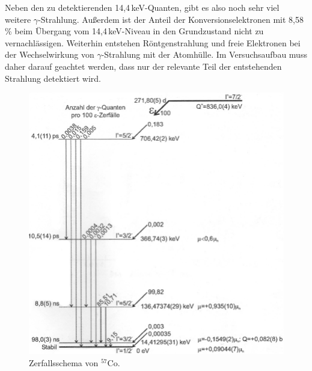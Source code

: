 	Neben den zu detektierenden 14,4\,keV-Quanten, gibt es also noch sehr viel weitere $\gamma$-Strahlung. Außerdem ist der Anteil der Konversionselektronen mit 8,58\,\% beim Übergang vom 14,4\,keV-Niveau in den Grundzustand nicht zu vernachlässigen. Weiterhin entstehen Röntgenstrahlung und freie Elektronen bei der Wechselwirkung von $\gamma$-Strahlung mit der Atomhülle. Im Versuchsaufbau muss daher darauf geachtet werden, dass nur der relevante Teil der entstehenden Strahlung detektiert wird.    
    
	\begin{figure}[H]
		\centering
		\includegraphics[width=0.9\linewidth]{img/Zerfallsschema}
		\caption{Zerfallsschema von $^{57}$Co.\cite{wwu}}
		\label{fig:zerfallsschema}
	\end{figure}
